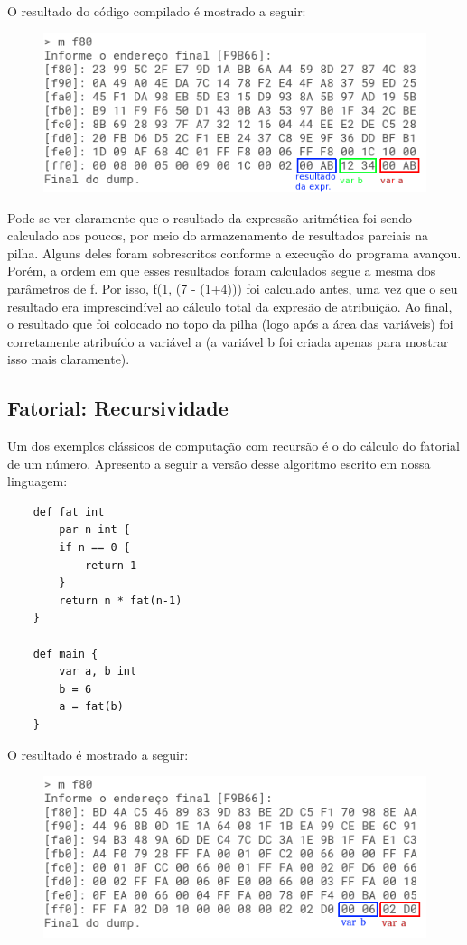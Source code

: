 \documentclass[a4paper,12pt]{report}
\begin{document}
    O resultado do código compilado é mostrado a seguir:

    \begin{figure}[h]
        \centering
        \includegraphics[scale=0.65]{chamada_subrotinas_aninhadas}
    \end{figure}

    Pode-se ver claramente que o resultado da expressão aritmética foi sendo calculado aos poucos, por meio do armazenamento de resultados parciais na pilha. Alguns deles foram sobrescritos conforme a execução do programa avançou. Porém, a ordem em que esses resultados foram calculados segue a mesma dos parâmetros de f. Por isso, f(1, (7 - (1+4))) foi calculado antes, uma vez que o seu resultado era imprescindível ao cálculo total da expresão de atribuição. Ao final, o resultado que foi colocado no topo da pilha (logo após a área das variáveis) foi corretamente atribuído a variável a (a variável b foi criada apenas para mostrar isso mais claramente).
    
    \subsection*{Fatorial: Recursividade}
    Um dos exemplos clássicos de computação com recursão é o do cálculo do fatorial de um número. Apresento a seguir a versão desse algoritmo escrito em nossa linguagem:

    \begin{lstlisting}
    def fat int
        par n int {
        if n == 0 {
            return 1
        }
        return n * fat(n-1)
    }

    def main {
        var a, b int
        b = 6
        a = fat(b)
    }
    \end{lstlisting}

    O resultado é mostrado a seguir:
    \newpage
    \begin{figure}[h]
        \centering
        \includegraphics[scale=0.65]{fat_recursao}
    \end{figure}
\end{document}
